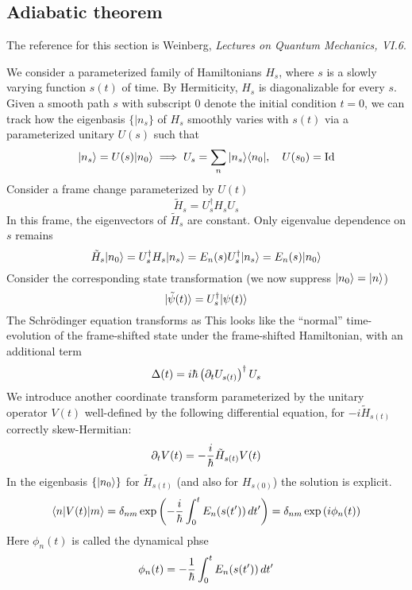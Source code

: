 \subsection{Adiabatic theorem}
The reference for this section is Weinberg, \textit{Lectures on Quantum Mechanics, VI.6}. 

We consider a parameterized family of Hamiltonians $H_s$, where $s$ is a slowly varying 
function $s(t)$ of time. By Hermiticity, $H_s$ is diagonalizable for every $s$. 
Given a smooth path $s$ with subscript $0$ denote the initial condition $t=0$, 
we can track how the eigenbasis $\{|n_s\}$ of $H_s$ smoothly varies with $s(t)$ 
via a parameterized unitary $U(s)$ such that 
\[ 
    |n_s\rangle = U(s)|n_0\rangle \implies U_s = \sum_n |n_s\rangle\langle n_0|,\quad U(s_0) = \mathrm{Id}
\] 
Consider a frame change parameterized by $U(t)$ 
\[ 
    \tilde H_s = U_s^\dag H_s U_s 
\] 
In this frame, the eigenvectors of $\tilde H_s$ are constant. Only eigenvalue 
dependence on $s$ remains 
\[ 
    \tilde H_s |n_0\rangle = U_s^\dag H_s |n_s\rangle = E_n(s) U_s^\dag|n_s\rangle = E_n(s)|n_0\rangle 
\] 
Consider the corresponding state transformation (we now suppress $|n_0\rangle = |n\rangle$)
\[ 
    |\tilde \psi(t)\rangle = U_s^\dag |\psi(t)\rangle 
\] 
The Schrödinger equation transforms as 
This looks like the ``normal'' time-evolution of the frame-shifted state 
under the frame-shifted Hamiltonian, with an additional term 
\[ 
    \Delta(t) = i\hbar \left(\partial_{t} U_{s(t)}\right)^\dag U_s
\] 
We introduce another coordinate transform parameterized by the 
unitary operator $V(t)$ well-defined by the following differential equation, for $-i\tilde H_{s(t)}$ 
correctly skew-Hermitian: 
\[ 
    \partial_{t} V(t) = -\dfrac i {\hbar} \tilde H_{s(t)}V(t)
\] 
In the eigenbasis $\{|n_0\rangle\}$ for $\tilde H_{s(t)}$ (and also for $H_{s(0)}$) 
the solution is explicit.  
\[ 
    \langle n|V(t)|m\rangle = \delta_{nm}\exp \left(-\dfrac i {\hbar}\int_0^t E_n(s(t'))\, dt' \right)
    = \delta_{nm} \exp\left(i\phi_n(t)\right)
\] 
Here $\phi_n(t)$ is called the dynamical phse 
\[ 
    \phi_n(t) = -\dfrac 1 {\hbar} \int_0^t E_n(s(t'))\, dt'
\] 
